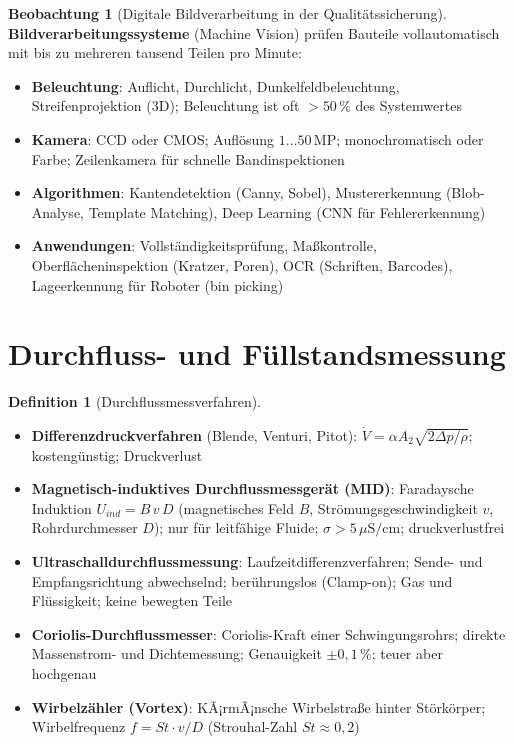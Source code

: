 ﻿\documentclass[a4paper,12pt]{report}
\theoremstyle{definition}
\newtheorem{definition}{Definition}
\newtheorem{beobachtung}{Beobachtung}
\begin{document}
\begin{beobachtung}[Digitale Bildverarbeitung in der Qualitätssicherung]
\textbf{Bildverarbeitungssysteme} (Machine Vision) prüfen Bauteile
vollautomatisch mit bis zu mehreren tausend Teilen pro Minute:
\begin{itemize}
    \item[-] \textbf{Beleuchtung}: Auflicht, Durchlicht, Dunkelfeldbeleuchtung,
          Streifenprojektion (3D); Beleuchtung ist oft $> 50\,\%$ des Systemwertes
    \item[-] \textbf{Kamera}: CCD oder CMOS; Auflösung $1\ldots50\,\mathrm{MP}$;
          monochromatisch oder Farbe; Zeilenkamera für schnelle Bandinspektionen
    \item[-] \textbf{Algorithmen}: Kantendetektion (Canny, Sobel),
          Mustererkennung (Blob-Analyse, Template Matching),
          Deep Learning (CNN für Fehlererkennung)
    \item[-] \textbf{Anwendungen}: Vollständigkeitsprüfung, Maßkontrolle,
          Oberflächeninspektion (Kratzer, Poren), OCR (Schriften, Barcodes),
          Lageerkennung für Roboter (bin picking)
\end{itemize}
\end{beobachtung}

\section{Durchfluss- und Füllstandsmessung}

\begin{definition}[Durchflussmessverfahren]
\begin{itemize}
    \item[-] \textbf{Differenzdruckverfahren} (Blende, Venturi, Pitot):
          $\dot{V} = \alpha A_2\sqrt{2\Delta p/\rho}$; kostengünstig; Druckverlust
    \item[-] \textbf{Magnetisch-induktives Durchflussmessgerät (MID)}:
          Faradaysche Induktion $U_{ind} = B\,v\,D$ (magnetisches Feld $B$,
          Strömungsgeschwindigkeit $v$, Rohrdurchmesser $D$);
          nur für leitfähige Fluide; $\sigma > 5\,\mu\mathrm{S/cm}$; druckverlustfrei
    \item[-] \textbf{Ultraschalldurchflussmessung}: Laufzeitdifferenzverfahren;
          Sende- und Empfangsrichtung abwechselnd; berührungslos (Clamp-on);
          Gas und Flüssigkeit; keine bewegten Teile
    \item[-] \textbf{Coriolis-Durchflussmesser}: Coriolis-Kraft einer Schwingungsrohrs;
          direkte Massenstrom- und Dichtemessung; Genauigkeit $\pm 0{,}1\,\%$;
          teuer aber hochgenau
    \item[-] \textbf{Wirbelzähler (Vortex)}: KÃ¡rmÃ¡nsche Wirbelstraße hinter Störkörper;
          Wirbelfrequenz $f = St\cdot v/D$ (Strouhal-Zahl $St \approx 0{,}2$)
\end{itemize}
\end{definition}
\end{document}
